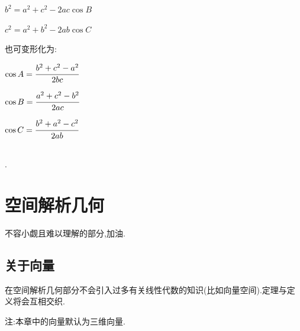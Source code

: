 \documentclass[UTF8,12pt]{ctexbook}
\begin{document}
{{{  $b^2 = a^2 + c^2 - 2ac\cos B$

  $c^2 = a^2 + b^2 - 2ab\cos C$

  也可变形化为:

  $\cos A = \cfrac{b^2 + c^2 - a^2}{2bc}$

  $\cos B = \cfrac{a^2 + c^2 - b^2}{2ac}$

  $\cos C = \cfrac{b^2 + a^2 - c^2}{2ab}$
}%
\\

.

}%

\section{空间解析几何}{
  不容小觑且难以理解的部分,加油.

  \subsection{关于向量}{
    在空间解析几何部分不会引入过多有关线性代数的知识(比如向量空间).定理与定义将会互相交织.

    注:本章中的向量默认为三维向量.

}}}
\end{document}

